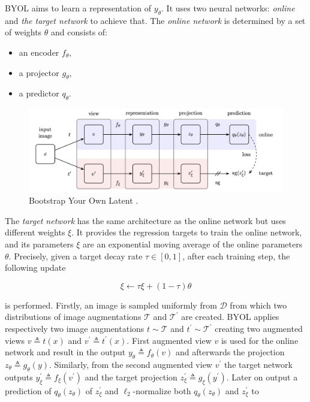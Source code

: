 \documentclass[
]{krantz}
\providecommand{\tightlist}{%
  \setlength{\itemsep}{0pt}\setlength{\parskip}{0pt}}
\begin{document}
BYOL aims to learn a representation of \(y_\theta\). It uses two neural networks: \emph{online} and \emph{the target network} to achieve that. The \emph{online network} is determined by a set of weights \(\theta\) and consists of:

\begin{itemize}
\tightlist
\item
  an encoder \(f_\theta\),
\item
  a projector \(g_\theta\),
\item
  a predictor \(q_\theta\).
\end{itemize}

\begin{figure}

{\centering \includegraphics[width=0.8\linewidth]{./figures/01-chapter1/BYOL} 

}

\caption{Bootstrap Your Own Latent \citep{BYOL}.}\label{fig:ch01-figure06}
\end{figure}



The \emph{target network} has the same architecture as the online network but uses different weights \(\xi\). It provides the regression targets to train the online network, and its parameters \(\xi\) are an exponential moving average of the online parameters \(\theta\). Precisely, given a target decay rate \(\tau \in[0,1]\), after each training step, the following update

\[
\xi \leftarrow \tau \xi+(1-\tau) \theta
\]

is performed.
Firstly, an image is sampled uniformly from \(\mathcal{D}\) from which two distributions of image augmentations \(\mathcal{T}\) and \(\mathcal{T}^{\prime}\) are created. BYOL applies respectively two image augmentations \(t \sim \mathcal{T}\) and \(t^{\prime} \sim \mathcal{T}^{\prime}\) creating two augmented views \(v \triangleq t(x)\) and \(v^{\prime} \triangleq t^{\prime}(x)\). First augmented view \(v\) is used for the online network and result in the output \(y_{\theta} \triangleq f_{\theta}(v)\) and afterwards the projection \(z_{\theta} \triangleq g_{\theta}(y)\). Similarly, from the second augmented view \(v^{\prime}\) the target network outputs \(y_{\xi}^{\prime} \triangleq f_{\xi}(v^{\prime})\) and the target projection \(z_{\xi}^{\prime} \triangleq g_{\xi}(y^{\prime})\). Later on output a prediction of \(q_{\theta}\left(z_{\theta}\right)\) of \(z_{\xi}^{\prime}\) and \(\ell_{2}\)-normalize both \(q_{\theta}\left(z_{\theta}\right)\) and \(z_{\xi}^{\prime}\) to
\end{document}
